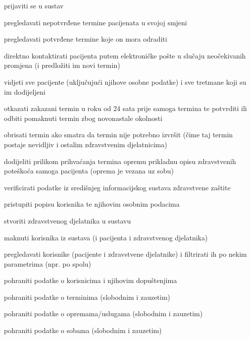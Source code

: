\begin{packed_enum}
\begin{packed_enum}
		\item prijaviti se u sustav
		\item pregledavati nepotvrđene termine pacijenata u svojoj smjeni
		\item pregledavati potvrđene termine koje on mora odraditi
		\item direktno kontaktirati pacijenta putem elektroničke pošte u slučaju neočekivanih promjena (i predložiti im novi termin)
		\item vidjeti sve pacijente (uključujući njihove osobne podatke) i sve tretmane koji su im dodijeljeni
		\item otkazati zakazani termin u roku od 24 sata prije samoga termina te potvrditi ili odbiti pomaknuti termin zbog novonastale okolnosti
		\item obrisati termin ako smatra da termin nije potrebno izvršit (čime taj termin postaje nevidljiv i ostalim zdravstvenim djelatnicima)
		\item dodijeliti prilikom prihvaćanja termina opremu prikladnu opisu zdravstvenih poteškoća samoga pacijenta (oprema je vezana uz sobu)
		
		
	\end{packed_enum}
	
	
	\item  {}
	
	\begin{packed_enum}
		
		\item verificirati podatke iz središnjeg informacijskog sustava zdravstvene zaštite
		\item pristupiti popisu korisnika te njihovim osobnim podacima
		\item stvoriti zdravstvenog djelatnika u sustavu
		\item maknuti korisnika iz sustava (i pacijenta i zdravstvenog djelatnika)
		\item pregledavati korisnike (pacijente i zdravstvene djelatnike) i filtrirati ih po nekim parametrima (npr. po spolu)
		
	\end{packed_enum}
	
	\item  {}
	
	\begin{packed_enum}
		
		\item pohraniti podatke o korisnicima i njihovim dopuštenjima
		\item pohraniti podatke o terminima (slobodnim i zauzetim)
		\item pohraniti podatke o opremama/uslugama (slobodnim i zauzetim)
		\item pohraniti podatke o sobama (slobodnim i zauzetim)
		
	\end{packed_enum}
\end{packed_enum}

